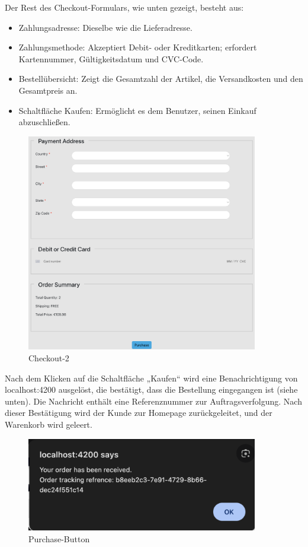 Der Rest des Checkout-Formulars, wie unten gezeigt, besteht aus:
\begin{itemize}
	\item Zahlungsadresse: Dieselbe wie die Lieferadresse.
	\item Zahlungsmethode: Akzeptiert Debit- oder Kreditkarten; erfordert Kartennummer, Gültigkeitsdatum und CVC-Code.
	\item Bestellübersicht: Zeigt die Gesamtzahl der Artikel, die Versandkosten und den Gesamtpreis an.
	\item Schaltfläche Kaufen: Ermöglicht es dem Benutzer, seinen Einkauf abzuschließen.
\end{itemize}

\begin{figure}[H]  
	\centering %
	\includegraphics[width=0.9\textwidth]{Images/Checkout_2.png} 
	\caption{Checkout-2} 
	\label{fig:sample4-image} 
\end{figure}

Nach dem Klicken auf die Schaltfläche „Kaufen“ wird eine Benachrichtigung von localhost:4200 ausgelöst, die bestätigt, dass die Bestellung eingegangen ist (siehe unten). Die Nachricht enthält eine Referenznummer zur Auftragsverfolgung. Nach dieser Bestätigung wird der Kunde zur Homepage zurückgeleitet, und der Warenkorb wird geleert.

\begin{figure}[H]  
	\centering %
	\includegraphics[width=0.9\textwidth]{Images/Purchase.png} 
	\caption{Purchase-Button} 
	\label{fig:sample5-image} 
\end{figure}


